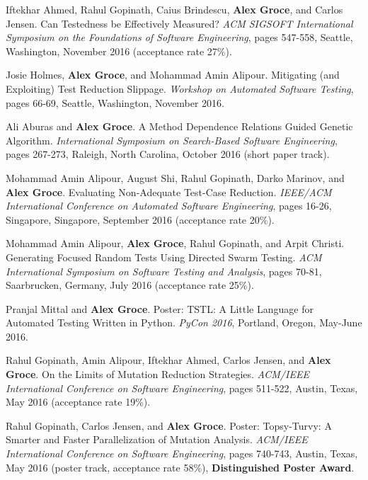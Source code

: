\documentclass[ComputerScience]{vita}
\begin{document}
\begin{vita}
\begin{Refereed Conference and Workshop Publications}
\item Iftekhar Ahmed, Rahul Gopinath, Caius Brindescu, {\bf Alex Groce}, and Carlos Jensen.
\newblock Can Testedness be Effectively Measured?
\newblock \emph{ACM SIGSOFT International Symposium on the Foundations of Software Engineering},  pages 547-558, Seattle, Washington, November 2016 (acceptance rate 27\%).

\item Josie Holmes, {\bf Alex Groce}, and Mohammad Amin Alipour.
\newblock Mitigating (and Exploiting) Test Reduction Slippage.
\newblock \emph{Workshop on Automated Software Testing}, pages 66-69, Seattle, Washington, November 2016.

\item Ali Aburas and {\bf Alex Groce}.
\newblock A Method Dependence Relations Guided Genetic Algorithm.
\newblock \emph{International Symposium on Search-Based Software Engineering}, pages 267-273, Raleigh, North Carolina, October 2016 (short paper track).

\item Mohammad Amin Alipour, August Shi, Rahul Gopinath, Darko Marinov, and {\bf Alex Groce}.
\newblock Evaluating Non-Adequate Test-Case Reduction.
\newblock \emph{IEEE/ACM International Conference on Automated Software Engineering}, pages 16-26, Singapore, Singapore, September 2016 (acceptance rate 20\%).

\item Mohammad Amin Alipour, {\bf Alex Groce}, Rahul Gopinath, and Arpit Christi.
\newblock Generating Focused Random Tests Using Directed Swarm Testing.
\newblock \emph{ACM International Symposium on Software Testing and Analysis}, pages 70-81, Saarbrucken, Germany, July 2016 (acceptance rate 25\%).

\item Pranjal Mittal and {\bf Alex Groce}.
\newblock Poster: TSTL: A Little Language for Automated Testing Written in Python.
\newblock \emph{PyCon 2016}, Portland, Oregon, May-June 2016.

\item Rahul Gopinath, Amin Alipour, Iftekhar Ahmed, Carlos Jensen, and {\bf Alex Groce}.
\newblock On the Limits of Mutation Reduction Strategies.
\newblock \emph{ACM/IEEE International Conference on Software Engineering}, pages 511-522, Austin, Texas, May 2016 (acceptance rate 19\%).

\item Rahul Gopinath, Carlos Jensen, and {\bf Alex Groce}.
\newblock Poster: Topsy-Turvy: A Smarter and Faster Parallelization of Mutation Analysis.
\newblock \emph{ACM/IEEE International Conference on Software Engineering}, pages 740-743, Austin, Texas, May 2016 (poster track, acceptance rate 58\%), {\bf Distinguished Poster Award}.


\end{Refereed Conference and Workshop Publications}
\end{vita}
\end{document}
